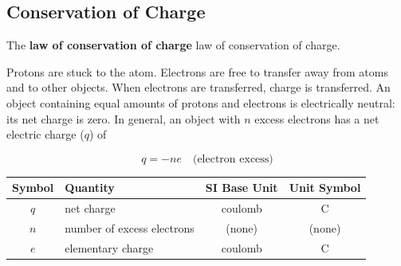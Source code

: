 \documentclass[dvipsnames]{article}
\begin{document}
\begin{center}
\hspace{1em}
\hspace{1em}


\end{center}

\subsection{Conservation of Charge}


The \textbf{\gls{law of conservation of charge}} \glsdesc{law of conservation of charge}.

Protons are stuck to the atom. Electrons are free to transfer away from atoms and to other objects. When electrons are transferred, charge is transferred. An object containing equal amounts of protons and electrons is electrically neutral: its net charge is zero. In general, an object with $n$ excess electrons has a net electric charge ($q$) of

\begin{equation} \label{Dabfyz}
    q = - ne \hspace{1em} \text{(electron excess)}
\end{equation}

\begin{center}
    \begin{tabular}{cl|cc}
    \hline
    \textbf{Symbol} & \textbf{Quantity} & \textbf{SI Base Unit} & \textbf{Unit Symbol}  \\
    \hline\hline
    \rule{0pt}{2.5ex}
        $q$ & net charge & coulomb & \si{\coulomb}\\
        $n$ & number of excess electrons & (none) & (none) \\
        $e$ & elementary charge & coulomb & \si{\coulomb} \\
    \hline
    \end{tabular}
\end{center}
\end{document}
